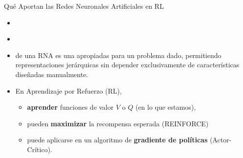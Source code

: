 \documentclass[10pt, envcountsect, handout, aspectratio=1610, hyperref={hypertexnames=true}]{beamer}
\begin{document}
\begin{frame}{Qué Aportan las Redes Neuronales Artificiales en RL}
\begin{itemize}
\begin{minipage}{.4\textwidth}
\begin{itemize}
			\item Segunda Capa (salida)
				\begin{itemize}
					\item $\hat{v}=h^{(2)} = f(w_1 h_1 + w_2 h_2 + b)$
				\end{itemize}
			
		\end{itemize}
	\end{minipage}
	
	
	\item[]
	
	~
	
	\item[] 
	
	~

	\item {} de una RNA es una  apropiadas para un problema dado, permitiendo representaciones jerárquicas sin depender exclusivamente de características diseñadas manualmente.
		
	\item En Aprendizaje por Refuerzo (RL), 
		
		\begin{itemize}
			\item \textbf{aprender} funciones de valor $V$ o $Q$ (en lo que estamos), 
			\item pueden \textbf{maximizar} la recompensa esperada (REINFORCE) 
			\item puede aplicarse en un algoritmo de \textbf{gradiente de políticas} (Actor-Crítico). 
		\end{itemize}
		
\end{itemize}
	
\end{frame}
\end{document}
